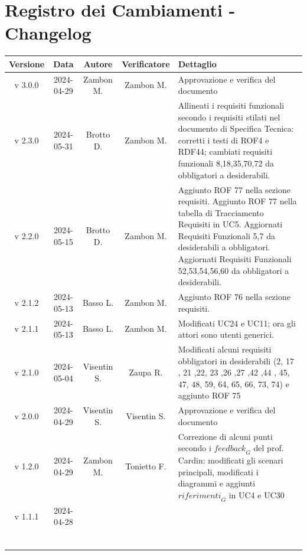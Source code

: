 \documentclass[12pt, oneside]{article}
\begin{document}
\section*{Registro dei Cambiamenti - Changelog}
\begin{longtable}{|c|c|c|c|p{7cm}|}
\hline
\textbf{Versione} & \textbf{Data} & \textbf{Autore} & \textbf{Verificatore} & 
\textbf{Dettaglio} \\
\hline
v 3.0.0 & 2024-04-29 & Zambon M. & Zambon M. & Approvazione e verifica del documento\\
\hline
v 2.3.0 & 2024-05-31 & Brotto D. & Zambon M. & Allineati i requisiti funzionali secondo i requisiti stilati nel documento di Specifica Tecnica: corretti i testi di ROF4 e RDF44; cambiati requisiti funzionali 8,18,35,70,72 da obbligatori a desiderabili. \\
\hline
v 2.2.0 & 2024-05-15 & Brotto D. & Zambon M. & Aggiunto ROF 77 nella sezione requisiti. \newline Aggiunto ROF 77 nella tabella di Tracciamento Requisiti in UC5. \newline Aggiornati Requisiti Funzionali 5,7 da desiderabili a obbligatori. \newline Aggiornati Requisiti Funzionali 52,53,54,56,60 da obbligatori a desiderabili.\\
\hline
v 2.1.2 & 2024-05-13 & Basso L. & Zambon M. & Aggiunto ROF 76 nella sezione requisiti. \\
\hline
v 2.1.1 & 2024-05-13 & Basso L. & Zambon M. & Modificati UC24 e UC11; ora gli attori sono utenti generici. \\
\hline
v 2.1.0 & 2024-05-04 & Visentin S. & Zaupa R. & Modificati alcuni requisiti obbligatori in desiderabili (2, 17 , 21 ,22, 23 ,26 ,27 ,42 ,44 , 45,  47, 48, 59, 64, 65, 66, 73, 74) e aggiunto ROF 75\\
\hline
v 2.0.0 & 2024-04-29 & Visentin S. & Visentin S. & Approvazione e verifica del documento\\
\hline
v 1.2.0 & 2024-04-29 & Zambon M. & Tonietto F. & Correzione di alcuni punti secondo i $\textit{feedback}_G$ del prof. Cardin: modificati gli scenari principali, modificati i diagrammi e aggiunti $\textit{riferimenti}_G$ in UC4 e UC30\\
\hline
v 1.1.1 & 2024-04-28 &   \begin{tabular}[c]{@{}c@{}}
    Basso L. \\
  \end{tabular}  & \begin{tabular}[c]{@{}c@{}}

\end{tabular}
\end{longtable}
\end{document}
